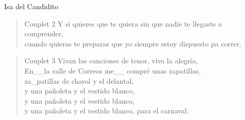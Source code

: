 \begin{song}[vals]{Isa del Candidito}
\begin{verse}{Couplet 2}
Y si quieres que te quiera sin que nadie te llegaste a comprender,\\
cuando quieras te preparas que yo siempre estoy dispuesto pa correr.\\
\end{verse}

\clearpage
\begin{verse}{Couplet 3}
Vivan las canciones de tenor, viva la alegría,\\
En\_\_la calle de Correos me\_\_ compré unas zapatillas,\\
za\_patillas de charol y el delantal,\\
y una pañoleta y el vestido blanco,\\
y una pañoleta y el vestido blanco,\\
y una pañoleta y el vestido blanco, para el carnaval.\\
\end{verse}

\end{song}

